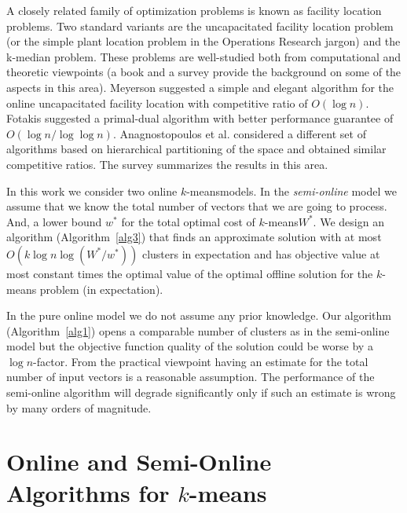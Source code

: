 \documentclass[11pt,twoside]{article}
\newcommand{\kmeans}{$k$-means}
\begin{document}
A closely related family of optimization problems is known as facility location problems. Two standard variants are the uncapacitated facility location problem (or the simple plant location problem in the Operations Research jargon) and the k-median problem. These problems are well-studied both from computational and theoretic viewpoints (a book \cite{drezner2004facility} and a survey \cite{Vygen05} provide the  background on some of the aspects in this area). Meyerson \cite{Meyerson01} suggested a simple and elegant algorithm for the online uncapacitated facility location with competitive ratio of $O(\log n)$. Fotakis \cite{Fotakis08} suggested a primal-dual algorithm with better performance guarantee of $O(\log n/\log \log n)$. Anagnostopoulos et al. \cite{AilonJM09} considered a different set of algorithms based on hierarchical partitioning of the space and obtained similar competitive ratios. The survey \cite{Fotakis11} summarizes the results in this area.

In this work we consider two online \kmeans models. In the {\it semi-online} model we assume that we know the total number of vectors that we are going to process. 
And, a lower bound $w^*$ for the total optimal cost of \kmeans $W^*$. 
We design an algorithm (Algorithm~\ref{alg3}) that finds an approximate solution with at most $O(k\log n \log (W^*/w^*))$ clusters in expectation and has objective value at most constant times the optimal value of the optimal offline solution for the $k$-means problem (in expectation). 

In the pure online model we do not assume any prior knowledge.
Our algorithm (Algorithm~\ref{alg1}) opens a comparable number of clusters as in the semi-online model but the objective function quality of the solution could be worse by a $\log n$-factor. 
From the practical viewpoint having an estimate for the total number of input vectors is a reasonable assumption. 
The performance of the semi-online algorithm will degrade significantly only if such an estimate is wrong by many orders of magnitude.  




\section{Online and Semi-Online Algorithms for $k$-means}\label{alg}
\end{document}
